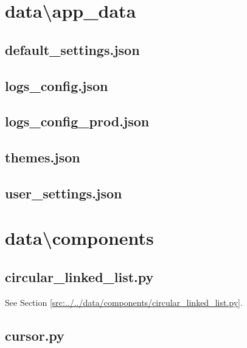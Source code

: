 \documentclass[../main/main.tex]{subfiles}
\begin{document}
\section{data\textbackslash app\_data}
\subsection{default\_settings.json}

\label{src:data/app_data/default_settings.json}

\subsection{logs\_config.json}

\label{src:data/app_data/logs_config.json}

\subsection{logs\_config\_prod.json}

\label{src:data/app_data/logs_config_prod.json}

\subsection{themes.json}

\label{src:data/app_data/themes.json}

\subsection{user\_settings.json}

\label{src:data/app_data/user_settings.json}

\section{data\textbackslash components}
\subsection{circular\_linked\_list.py}
See Section \ref{src:../../data/components/circular_linked_list.py}.

\subsection{cursor.py}

\label{src:data/components/cursor.py}
\end{document}
